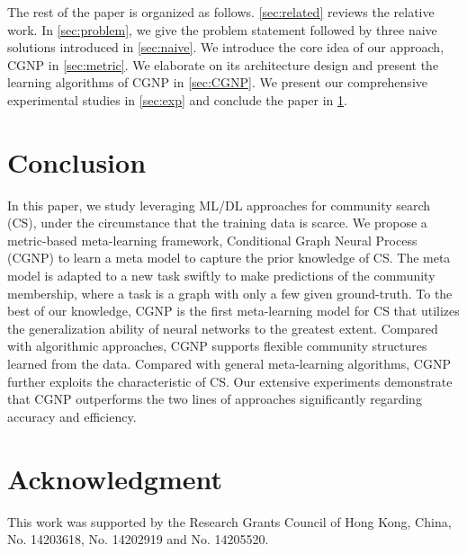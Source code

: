 \documentclass[conference]{IEEEtran}
\begin{document}



The rest of the paper is organized as follows. 
\cref{sec:related} reviews the relative work. In \cref{sec:problem}, we give the problem statement followed by three naive solutions introduced in \cref{sec:naive}.
We introduce the core idea of our approach, CGNP in \cref{sec:metric}. We elaborate on its architecture design and present the learning algorithms of CGNP in \cref{sec:CGNP}. 
We present our comprehensive experimental studies in \cref{sec:exp} and conclude the paper in \cref{sec:conclusion}.






\section{Conclusion}
\label{sec:conclusion}
In this paper, we study leveraging ML/DL approaches for community search (CS), under the circumstance that the training data is scarce. 
We propose a metric-based meta-learning framework, Conditional Graph Neural Process (CGNP) to learn a meta model to capture the prior knowledge of CS.
The meta model is adapted to a new task swiftly to make predictions of the community membership, where a task is a graph with only a few given ground-truth. 
To the best of our knowledge, CGNP is the first meta-learning model for CS that utilizes the generalization ability of neural networks to the greatest extent.
Compared with algorithmic approaches, CGNP supports flexible community structures learned from the data. Compared with general meta-learning algorithms, CGNP further exploits the characteristic of CS. Our extensive experiments demonstrate that CGNP outperforms the two lines of approaches significantly regarding accuracy and efficiency.

\section*{Acknowledgment}
This work was supported by the Research Grants Council of Hong Kong, China, No. 14203618, No. 14202919 and No. 14205520.




\end{document}
